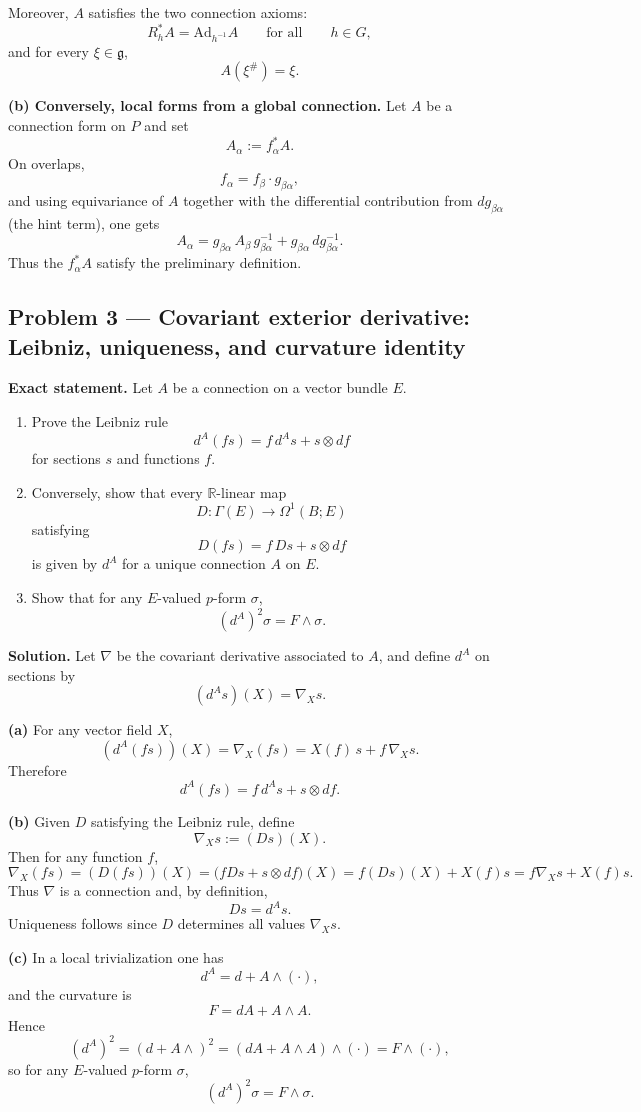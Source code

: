 \documentclass[12pt,a4paper]{article}
\theoremstyle{plain}
\theoremstyle{definition}      %
\begin{document}
Moreover, $A$ satisfies the two connection axioms:
\[
R_h^*A=\mathrm{Ad}_{h^{-1}}A
\qquad\text{for all}\qquad
h\in G,
\]
and for every $\xi\in\mathfrak{g}$,
\[
A(\xi^\#)=\xi.
\]

\textbf{(b) Conversely, local forms from a global connection.}
Let $A$ be a connection form on $P$ and set
\[
A_\alpha:=f_\alpha^*A.
\]
On overlaps,
\[
f_\alpha=f_\beta\cdot g_{\beta\alpha},
\]
and using equivariance of $A$ together with the differential contribution from $dg_{\beta\alpha}$ (the hint term), one gets
\[
A_\alpha
=
g_{\beta\alpha}\,A_\beta\,g_{\beta\alpha}^{-1}
+
g_{\beta\alpha}\,dg_{\beta\alpha}^{-1}.
\]
Thus the $f_\alpha^*A$ satisfy the preliminary definition.

\subsection*{Problem 3 — Covariant exterior derivative: Leibniz, uniqueness, and curvature identity}

\textbf{Exact statement.}
Let $A$ be a connection on a vector bundle $E$.
\begin{enumerate}[label=(\alph*)]
	\item Prove the Leibniz rule
	\[
	d^A(fs)= f\,d^A s + s\otimes df
	\]
	for sections $s$ and functions $f$.
	\item Conversely, show that every $\mathbb{R}$-linear map
	\[
	D:\Gamma(E)\longrightarrow \Omega^1(B;E)
	\]
	satisfying
	\[
	D(fs)= f\,Ds + s\otimes df
	\]
	is given by $d^A$ for a unique connection $A$ on $E$.
	\item Show that for any $E$-valued $p$-form $\sigma$,
	\[
	(d^A)^2\sigma = F\wedge \sigma.
	\]
\end{enumerate}

\textbf{Solution.}
Let $\nabla$ be the covariant derivative associated to $A$, and define $d^A$ on sections by
\[
(d^A s)(X)=\nabla_X s.
\]

\textbf{(a)}
For any vector field $X$,
\[
(d^A(fs))(X)
=
\nabla_X(fs)
=
X(f)\,s + f\,\nabla_X s.
\]
Therefore
\[
d^A(fs)= f\,d^A s + s\otimes df.
\]

\textbf{(b)}
Given $D$ satisfying the Leibniz rule, define
\[
\nabla_X s := (Ds)(X).
\]
Then for any function $f$,
\[
\nabla_X(fs)
=
(D(fs))(X)
=
\bigl(fDs + s\otimes df\bigr)(X)
=
f(Ds)(X)+X(f)s
=
f\nabla_X s + X(f)s.
\]
Thus $\nabla$ is a connection and, by definition,
\[
Ds=d^A s.
\]
Uniqueness follows since $D$ determines all values $\nabla_X s$.

\textbf{(c)}
In a local trivialization one has
\[
d^A = d + A\wedge(\cdot),
\]
and the curvature is
\[
F=dA + A\wedge A.
\]
Hence
\[
(d^A)^2
=
(d + A\wedge)^2
=
(dA + A\wedge A)\wedge(\cdot)
=
F\wedge(\cdot),
\]
so for any $E$-valued $p$-form $\sigma$,
\[
(d^A)^2\sigma = F\wedge \sigma.
\]
\end{document}
